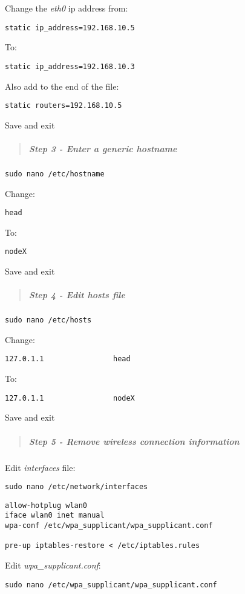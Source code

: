 \documentclass[]{article}
\let\oldsubparagraph\subparagraph
\renewcommand{\subparagraph}[1]{\oldsubparagraph{#1}\mbox{}}
\begin{document}
Change the \emph{eth0} ip address from:

\texttt{static\ ip\_address=192.168.10.5}

To:

\texttt{static\ ip\_address=192.168.10.3}

Also add to the end of the file:

\texttt{static\ routers=192.168.10.5}

Save and exit

\begin{quote}
\mbox{}%
\subparagraph{Step 3 - Enter a generic
hostname}\label{step-3---enter-a-generic-hostname}
\end{quote}

\texttt{sudo\ nano\ /etc/hostname}

Change:

\texttt{head}

To:

\texttt{nodeX}

Save and exit

\begin{quote}
\mbox{}%
\subparagraph{Step 4 - Edit hosts file}\label{step-4---edit-hosts-file}
\end{quote}

\texttt{sudo\ nano\ /etc/hosts}

Change:

\texttt{127.0.1.1\ \ \ \ \ \ \ \ \ \ \ \ \ \ \ \ head}

To:

\texttt{127.0.1.1\ \ \ \ \ \ \ \ \ \ \ \ \ \ \ \ nodeX}

Save and exit

\begin{quote}
\mbox{}%
\subparagraph{Step 5 - Remove wireless connection
information}\label{step-5---remove-wireless-connection-information}
\end{quote}

Edit \emph{interfaces} file:

\texttt{sudo\ nano\ /etc/network/interfaces}

\begin{verbatim}
allow-hotplug wlan0
iface wlan0 inet manual
wpa-conf /etc/wpa_supplicant/wpa_supplicant.conf

pre-up iptables-restore < /etc/iptables.rules
\end{verbatim}

Edit \emph{wpa\_supplicant.conf}:

\texttt{sudo\ nano\ /etc/wpa\_supplicant/wpa\_supplicant.conf}
\end{document}

